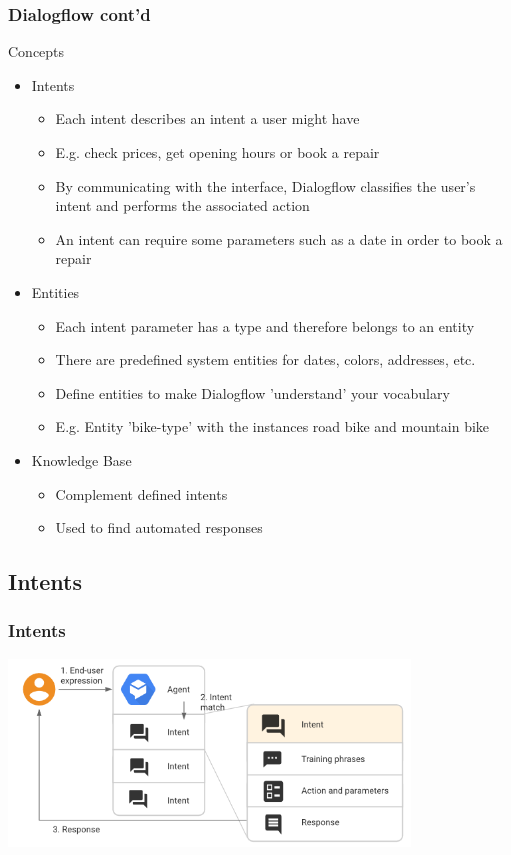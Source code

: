 \documentclass{beamer}
\begin{document}
\begin{frame}
\frametitle{Dialogflow cont'd}
\begin{block}{Concepts}
\begin{itemize}
\item Intents
\begin{itemize}
\item Each intent describes an intent a user might have
\item E.g. check prices, get opening hours or book a repair
\item By communicating with the interface, Dialogflow classifies the user's intent and performs the associated action
\item An intent can require some parameters such as a date in order to book a repair
\end{itemize}
\item Entities
\begin{itemize}
\item Each intent parameter has a type and therefore belongs to an entity
\item There are predefined system entities for dates, colors, addresses, etc.
\item Define entities to make Dialogflow 'understand' your vocabulary
\item E.g. Entity 'bike-type' with the instances road bike and mountain bike
\end{itemize}
\item Knowledge Base
\begin{itemize}
\item Complement defined intents
\item Used to find automated responses
\end{itemize}
\end{itemize}
\end{block}
\end{frame}



\subsection{Intents}

\begin{frame}
\frametitle{Intents}
\begin{center}
\includegraphics[width=0.8\textwidth]{pictures/intent.png}

\end{center}
\end{frame}
\end{document}
